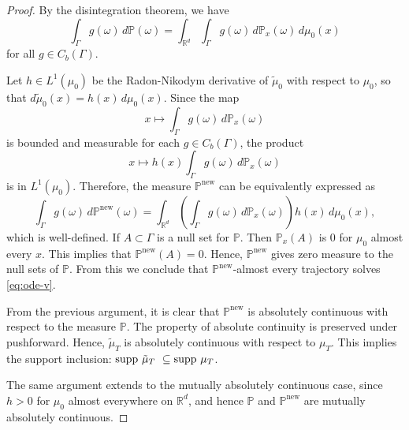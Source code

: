 \documentclass{article}
\newcommand{\Rd}{\mathbb{R}^d}
\begin{document}

\begin{proof}
By the disintegration theorem, we have
\[\int_{\Gamma} g(\omega) \, d\mathbb{P}(\omega) = \int_{\mathbb{R}^d} \int_{\Gamma} g(\omega) \, d\mathbb{P}_x(\omega) \, d\mu_0(x)\]
for all $g \in C_b(\Gamma)$.

Let $h \in L^1(\mu_0)$ be the Radon-Nikodym derivative of $\tilde{\mu}_0$ with respect to $\mu_0$, so that $d\tilde{\mu}_0(x) = h(x) \, d\mu_0(x)$. Since the map
\[x \mapsto \int_{\Gamma} g(\omega) \, d\mathbb{P}_x(\omega)\]
is bounded and measurable for each $g \in C_b(\Gamma)$, the product
\[x \mapsto h(x) \int_{\Gamma} g(\omega) \, d\mathbb{P}_x(\omega)\]
is in $L^1(\mu_0)$. Therefore, the measure $\mathbb{P}^{\mathrm{new}}$ can be equivalently expressed as
\[\int_{\Gamma} g(\omega) \, d\mathbb{P}^{\mathrm{new}}(\omega) = \int_{\mathbb{R}^d} \left(\int_{\Gamma} g(\omega) \, d\mathbb{P}_x(\omega)\right) h(x) \, d\mu_0(x),\]
which is well-defined.
If $A \subset \Gamma$ is a null set for $\mathbb{P}$. Then $\mathbb{P}_x(A)$ is $0$ for $\mu_0$ almost every $x$. This implies that $\mathbb{P}^{\mathrm{new}}(A) = 0 $.
Hence, $\mathbb{P}^{\mathrm{new}}$ gives zero measure to the null sets of $\mathbb{P}$. From this we conclude that $\mathbb{P}^{\mathrm{new}}$-almost every trajectory solves \eqref{eq:ode-v}.

From the previous argument, it is clear that $\mathbb{P}^{\mathrm{new}}$ is absolutely continuous with respect to the measure $\mathbb{P}$. The property of absolute continuity is preserved under pushforward. Hence, $\tilde{\mu}_T$ is absolutely continuous with respect to $\mu_T$. This implies the support inclusion:  ${\rm supp} ~\tilde{\mu}_T ~ \subseteq {\rm supp} ~ \mu_T$.


The same argument extends to the mutually absolutely continuous case, since $h>0$ for  $\mu_0$ almost everywhere on $\Rd$, and hence $\mathbb{P}$ and $\mathbb{P}^{\mathrm{new}}$ are mutually absolutely continuous.
\end{proof}
\end{document}
